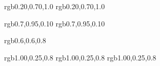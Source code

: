 \definecolor{todoblue}       {rgb}{0.20,0.70,1.0}  %
\definecolor{bluetodo}       {rgb}{0.20,0.70,1.0}  %

\definecolor{organizational} {rgb}{0.7,0.95,0.10}   %
\definecolor{org}            {rgb}{0.7,0.95,0.10}   %

\definecolor{done}           {rgb}{0.6,0.6,0.8}    %

\definecolor{cleanup}        {rgb}{1.00,0.25,0.8}
\definecolor{clean}          {rgb}{1.00,0.25,0.8}
\definecolor{tag}            {rgb}{1.00,0.25,0.8}

